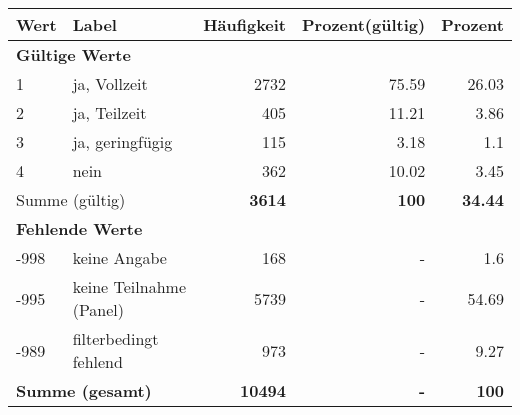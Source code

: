      \begin{longtable}{lXrrr}
     \toprule
     \textbf{Wert} & \textbf{Label} & \textbf{Häufigkeit} & \textbf{Prozent(gültig)} & \textbf{Prozent} \\
     \endhead
     \midrule
     \multicolumn{5}{l}{\textbf{Gültige Werte}}\\

     1 &
     \multicolumn{1}{X}{ ja, Vollzeit   } &


       \num{2732} &
       \num[round-mode=places,round-precision=2]{75.59} &
         \num[round-mode=places,round-precision=2]{26.03} \\

     2 &
     \multicolumn{1}{X}{ ja, Teilzeit   } &


       \num{405} &
       \num[round-mode=places,round-precision=2]{11.21} &
         \num[round-mode=places,round-precision=2]{3.86} \\

     3 &
     \multicolumn{1}{X}{ ja, geringfügig   } &


       \num{115} &
       \num[round-mode=places,round-precision=2]{3.18} &
         \num[round-mode=places,round-precision=2]{1.1} \\

     4 &
     \multicolumn{1}{X}{ nein   } &


       \num{362} &
       \num[round-mode=places,round-precision=2]{10.02} &
         \num[round-mode=places,round-precision=2]{3.45} \\
     \midrule
     \multicolumn{2}{l}{Summe (gültig)} &
       \textbf{\num{3614}} &
     \textbf{\num{100}} &
       \textbf{\num[round-mode=places,round-precision=2]{34.44}} \\
     \multicolumn{5}{l}{\textbf{Fehlende Werte}}\\
       -998 &
       keine Angabe &
         \num{168} &
        - &
         \num[round-mode=places,round-precision=2]{1.6} \\
       -995 &
       keine Teilnahme (Panel) &
         \num{5739} &
        - &
         \num[round-mode=places,round-precision=2]{54.69} \\
       -989 &
       filterbedingt fehlend &
         \num{973} &
        - &
         \num[round-mode=places,round-precision=2]{9.27} \\
     \midrule
     \multicolumn{2}{l}{\textbf{Summe (gesamt)}} &
          \textbf{\num{10494}} &
        \textbf{-} &
        \textbf{\num{100}} \\
     \bottomrule
     \end{longtable}
     
